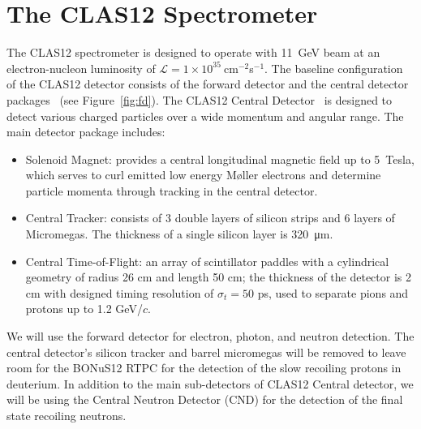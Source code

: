 \section{The CLAS12 Spectrometer}
The CLAS12 spectrometer is designed to operate with 11~GeV beam at an 
electron-nucleon luminosity of $\mathcal{L} = 
1\times10^{35}~$cm$^{-2}$s$^{-1}$. The baseline configuration of the CLAS12 
detector consists of the forward detector and the central detector 
packages~\cite{CD} (see Figure~\ref{fig:fd}).
The CLAS12 Central Detector~\cite{CD} is designed to detect various charged 
particles over a wide momentum and angular range. The main detector package 
includes:
\begin{itemize}
 \item Solenoid Magnet: provides a central longitudinal magnetic field up to 
5~Tesla, which serves to curl emitted low energy M{\o}ller electrons and determine 
particle momenta through tracking in the central detector.
 \item Central Tracker: consists of 3 double layers of silicon strips and 6 
    layers of Micromegas. The thickness of a single silicon layer is  
    \SI{320}{\um}.
 \item Central Time-of-Flight: an array of scintillator paddles with a 
cylindrical geometry of radius 26 cm and length 50 cm; the thickness of the 
detector is 2 cm with designed timing resolution of $\sigma_t = 50$ ps, used 
to separate pions and protons up to 1.2 GeV/$c$.
\end{itemize}

We will use the forward detector for electron, photon, and neutron detection.  
The central detector's silicon tracker and barrel micromegas will be removed to 
leave room for the BONuS12 RTPC for the detection of the slow recoiling protons 
in deuterium. In addition to the main sub-detectors of CLAS12 Central detector, 
we will be using the Central Neutron Detector (CND) for the detection of the 
final state recoiling neutrons.  

